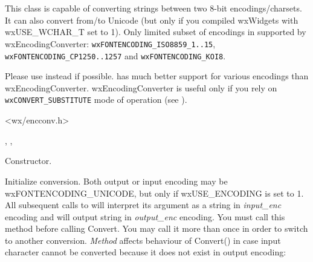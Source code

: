 %
%

\section{}\label{wxencodingconverter}

This class is capable of converting strings between two
8-bit encodings/charsets. It can also convert from/to Unicode (but only
if you compiled wxWidgets with wxUSE\_WCHAR\_T set to 1). Only limited subset
of encodings in supported by wxEncodingConverter:
{\tt wxFONTENCODING\_ISO8859\_1..15}, {\tt wxFONTENCODING\_CP1250..1257} and 
{\tt wxFONTENCODING\_KOI8}.


Please use  instead
if possible.  has much better support for various
encodings than wxEncodingConverter. wxEncodingConverter is useful only
if you rely on {\tt wxCONVERT\_SUBSTITUTE} mode of operation (see 
).




<wx/encconv.h>


, 
, 



\label{wxencodingconverterwxencodingconverter}


Constructor.

\label{wxencodingconverterinit}


Initialize conversion. Both output or input encoding may
be wxFONTENCODING\_UNICODE, but only if wxUSE\_ENCODING is set to 1.
All subsequent calls to  
will interpret its argument
as a string in {\it input\_enc} encoding and will output string in 
{\it output\_enc} encoding.
You must call this method before calling Convert. You may call 
it more than once in order to switch to another conversion.
{\it Method} affects behaviour of Convert() in case input character
cannot be converted because it does not exist in output encoding:


